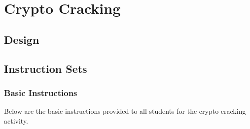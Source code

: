 \providecommand{\heading}[1]{\section{#1}}
\providecommand{\subheading}[1]{\subsection{#1}}

\heading{Crypto Cracking}\label{subsec:CTFs-cc}

    \subheading{Design}

    \subheading{Instruction Sets}\label{subsubsec:CTFs-cc-instructions}

        \subsubsection{Basic Instructions}
            \noindent
            Below are the basic instructions provided to all students for the crypto cracking activity.
